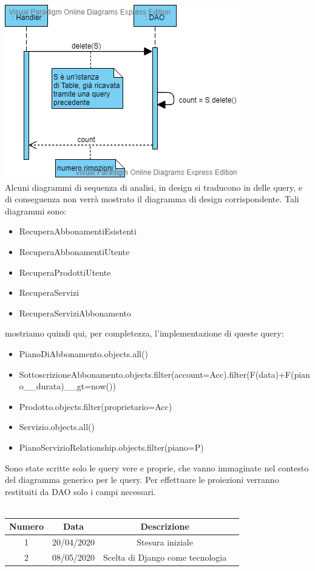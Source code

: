\includegraphics[scale=0.7]{../Contents/Diagrams/Design/sequence/DAO/delete.png}\\
Alcuni diagrammi di sequenza di analisi, in design si traducono in delle query, e di conseguenza non verrà mostrato il diagramma di design corrispondente. Tali diagrammi sono:
\begin{itemize}
\item RecuperaAbbonamentiEsistenti
\item RecuperaAbbonamentiUtente
\item RecuperaProdottiUtente
\item RecuperaServizi
\item RecuperaServiziAbbonamento
\end{itemize}
mostriamo quindi qui, per completezza, l'implementazione di queste query:
\begin{itemize}
\item PianoDiAbbonamento.objects.all()
\item SottoscrizioneAbbonamento.objects.filter(account=Acc).filter(F(data)+F(piano\_\_durata)\_\_gt=now())
\item Prodotto.objects.filter(proprietario=Acc)
\item Servizio.objects.all()
\item PianoServizioRelationship.objects.filter(piano=P)
\end{itemize}
Sono state scritte solo le query vere e proprie, che vanno immaginate nel contesto del diagramma generico per le query. Per effettuare le proiezioni verranno restituiti da DAO solo i campi necessari.
\newline\newline
{} \\ \\
\begin{tabular}{|c | c | c | c|} 
 	\hline
	 Numero & Data & Descrizione \\ [0.5ex] 
	\hline\hline
	1 & 20/04/2020 & Stesura iniziale \\ 
	\hline
	2 & 08/05/2020 & Scelta di Django come tecnologia \\
	\hline
\end{tabular}